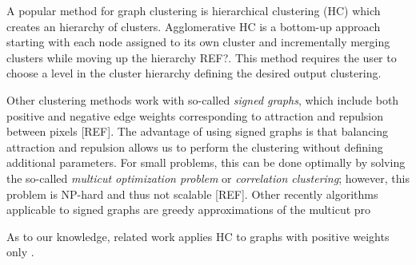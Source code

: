 A popular method for graph clustering is hierarchical clustering (HC) which creates an hierarchy of clusters. Agglomerative HC is a bottom-up approach starting with each node assigned to its own cluster and incrementally merging clusters while moving up the hierarchy REF?. This method requires the user to choose a level in the cluster hierarchy defining the desired output clustering. 

Other clustering methods work with so-called \emph{signed graphs}, which include both positive and negative edge weights corresponding to attraction and repulsion between pixels [REF]. The advantage of using signed graphs is that balancing attraction and repulsion allows us to perform the clustering without defining additional parameters. For small problems, this can be done optimally by solving the so-called \emph{multicut optimization problem} or \emph{correlation clustering}; however, this problem is NP-hard and thus not scalable [REF]. Other recently algorithms applicable to signed graphs are greedy approximations of the multicut pro



As to our knowledge, related work applies HC to graphs with positive weights only . 

